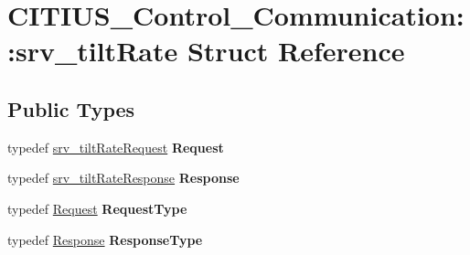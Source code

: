 \hypertarget{struct_c_i_t_i_u_s___control___communication_1_1srv__tilt_rate}{\section{\-C\-I\-T\-I\-U\-S\-\_\-\-Control\-\_\-\-Communication\-:\-:srv\-\_\-tilt\-Rate \-Struct \-Reference}
\label{struct_c_i_t_i_u_s___control___communication_1_1srv__tilt_rate}
}
\subsection*{\-Public \-Types}
\begin{DoxyCompactItemize}
\item 
\hypertarget{struct_c_i_t_i_u_s___control___communication_1_1srv__tilt_rate_aee070b8e28894ebc3fbbcda73c9c0ddf}{typedef \hyperlink{struct_c_i_t_i_u_s___control___communication_1_1srv__tilt_rate_request__}{srv\-\_\-tilt\-Rate\-Request} {\bfseries \-Request}}\label{struct_c_i_t_i_u_s___control___communication_1_1srv__tilt_rate_aee070b8e28894ebc3fbbcda73c9c0ddf}

\item 
\hypertarget{struct_c_i_t_i_u_s___control___communication_1_1srv__tilt_rate_a91fa90e46f0dd732ef8b2e38b31f03a7}{typedef \hyperlink{struct_c_i_t_i_u_s___control___communication_1_1srv__tilt_rate_response__}{srv\-\_\-tilt\-Rate\-Response} {\bfseries \-Response}}\label{struct_c_i_t_i_u_s___control___communication_1_1srv__tilt_rate_a91fa90e46f0dd732ef8b2e38b31f03a7}

\item 
\hypertarget{struct_c_i_t_i_u_s___control___communication_1_1srv__tilt_rate_aa8d026c41f306a82cecd932fed2b460a}{typedef \hyperlink{struct_c_i_t_i_u_s___control___communication_1_1srv__tilt_rate_request__}{\-Request} {\bfseries \-Request\-Type}}\label{struct_c_i_t_i_u_s___control___communication_1_1srv__tilt_rate_aa8d026c41f306a82cecd932fed2b460a}

\item 
\hypertarget{struct_c_i_t_i_u_s___control___communication_1_1srv__tilt_rate_a55ff1bda47436835711ce5304adca711}{typedef \hyperlink{struct_c_i_t_i_u_s___control___communication_1_1srv__tilt_rate_response__}{\-Response} {\bfseries \-Response\-Type}}\label{struct_c_i_t_i_u_s___control___communication_1_1srv__tilt_rate_a55ff1bda47436835711ce5304adca711}

\end{DoxyCompactItemize}
